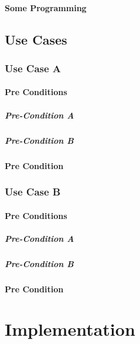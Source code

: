 \documentclass[12pt, a4paper, twoside, titlepage]{book}
\begin{document}
    \subsection{Some Programming}

\chapter{Use Cases}
\section{Use Case A}
    \subsection{Pre Conditions}
        \subsubsection{Pre-Condition A}
        \subsubsection{Pre-Condition B}
    \subsection{Pre Condition}
\section{Use Case B}
    \subsection{Pre Conditions}
        \subsubsection{Pre-Condition A}
        \subsubsection{Pre-Condition B}
    \subsection{Pre Condition}

\part{Implementation}
\end{document}
